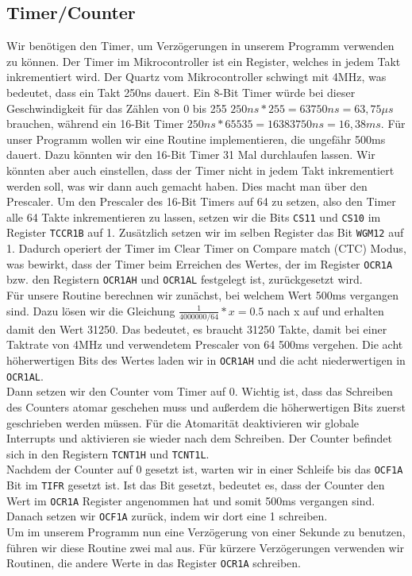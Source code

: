 \documentclass[]{article}
\begin{document}
\subsection{Timer/Counter}
Wir benötigen den Timer, um Verzögerungen in unserem Programm verwenden zu können. Der Timer im Mikrocontroller ist ein Register, welches in jedem Takt inkrementiert wird. Der Quartz vom Mikrocontroller schwingt mit 4MHz, was bedeutet, dass ein Takt 250ns dauert. Ein 8-Bit Timer würde bei dieser Geschwindigkeit für das Zählen von 0 bis 255 $250ns*255 = 63750ns = 63,75\mu s$ brauchen, während ein 16-Bit Timer  $250ns*65535 = 16383750ns = 16,38ms$. Für unser Programm wollen wir eine Routine implementieren, die ungefähr 500ms dauert. Dazu könnten wir den 16-Bit Timer 31 Mal durchlaufen lassen. Wir könnten aber auch einstellen, dass der Timer nicht in jedem Takt inkrementiert werden soll, was wir dann auch gemacht haben. Dies macht man über den Prescaler. Um den Prescaler des 16-Bit Timers auf 64 zu setzen, also den Timer alle 64 Takte inkrementieren zu lassen, setzen wir die Bits \texttt{CS11} und \texttt{CS10} im Register \texttt{TCCR1B} auf 1. Zusätzlich setzen wir im selben Register das Bit \texttt{WGM12} auf 1. Dadurch operiert der Timer im Clear Timer on Compare match (CTC) Modus, was bewirkt, dass der Timer beim Erreichen des Wertes, der im Register \texttt{OCR1A} bzw. den Registern \texttt{OCR1AH} und \texttt{OCR1AL} festgelegt ist, zurückgesetzt wird. 
\\Für unsere Routine berechnen wir zunächst, bei welchem Wert 500ms vergangen sind. Dazu lösen wir die Gleichung $\frac{1}{4000000/64} * x = 0.5$ nach x auf und erhalten damit den Wert 31250. Das bedeutet, es braucht 31250 Takte, damit bei einer Taktrate von 4MHz und verwendetem Prescaler von 64 500ms vergehen. Die acht höherwertigen Bits des Wertes laden wir in \texttt{OCR1AH} und die acht niederwertigen in \texttt{OCR1AL}. 
\\Dann setzen wir den Counter vom Timer auf 0. Wichtig ist, dass das Schreiben des Counters atomar geschehen muss und außerdem die höherwertigen Bits zuerst geschrieben werden müssen. Für die Atomarität deaktivieren wir globale Interrupts und aktivieren sie wieder nach dem Schreiben. Der Counter befindet sich in den Registern \texttt{TCNT1H} und \texttt{TCNT1L}.
\\Nachdem der Counter auf 0 gesetzt ist, warten wir in einer Schleife bis das \texttt{OCF1A} Bit im \texttt{TIFR} gesetzt ist. Ist das Bit gesetzt, bedeutet es, dass der Counter den Wert im \texttt{OCR1A} Register angenommen hat und somit 500ms vergangen sind. Danach setzen wir \texttt{OCF1A} zurück, indem wir dort eine 1 schreiben.
\\Um im unserem Programm nun eine Verzögerung von einer Sekunde zu benutzen, führen wir diese Routine zwei mal aus. Für kürzere Verzögerungen verwenden wir Routinen, die andere Werte in das Register \texttt{OCR1A} schreiben.
\end{document}
